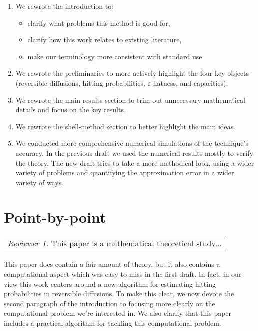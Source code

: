 \documentclass{article}
\begin{document}
\begin{enumerate}
    \item We rewrote the introduction to:
    \begin{itemize}
        \item clarify what problems this method is good for,
        \item clarify how this work relates to existing literature,
        \item make our terminology more consistent with standard use.
    \end{itemize}
    \item We rewrote the preliminaries to more actively highlight the four key objects (reversible diffusions, hitting probabilities, $\varepsilon$-flatness, and capacities).
    \item We rewrote the main results section to trim out unnecessary mathematical details and focus on the key results.
    \item We rewrote the shell-method section to better highlight the main ideas. 
    \item We conducted more comprehensive numerical simulations of the technique's accuracy.  In the previous draft we used the numerical results mostly to verify the theory.  The new draft tries to take a more methodical look, using a wider variety of problems and quantifying the approximation error in a wider variety of ways.  
\end{enumerate}


\section{Point-by-point}

\newcommand{\rev}[3]{\noindent\begin{tabular}{|p{4.5in}}\emph{Reviewer #1.}  #2\end{tabular}\vspace{.1in}

#3\vspace{.3in}}

\rev{1}{This paper is a mathematical theoretical study...}{

This paper does contain a fair amount of theory, but it also contains a computational aspect which was easy to miss in the first draft.  In fact, in our view this work centers around a new algorithm for estimating hitting probabilities in reversible diffusions.  To make this clear, we now devote the second paragraph of the introduction to focusing more clearly on the computational problem we're interested in.  We also clarify that this paper includes a practical algorithm for tackling this computational problem.}
\end{document}
